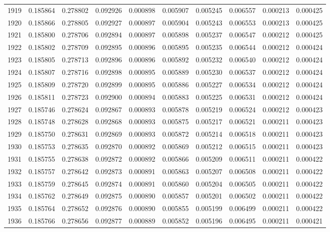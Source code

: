 \begin{tabular}{lrrrrrrrrr}
1919 & 0.185864 & 0.278802 & 0.092926 & 0.000898 & 0.005907 & 0.005245 & 0.006557 & 0.000213 & 0.000425 \\
1920 & 0.185866 & 0.278805 & 0.092927 & 0.000897 & 0.005904 & 0.005243 & 0.006553 & 0.000213 & 0.000425 \\
1921 & 0.185800 & 0.278706 & 0.092894 & 0.000897 & 0.005898 & 0.005237 & 0.006547 & 0.000212 & 0.000425 \\
1922 & 0.185802 & 0.278709 & 0.092895 & 0.000896 & 0.005895 & 0.005235 & 0.006544 & 0.000212 & 0.000424 \\
1923 & 0.185805 & 0.278713 & 0.092896 & 0.000896 & 0.005892 & 0.005232 & 0.006540 & 0.000212 & 0.000424 \\
1924 & 0.185807 & 0.278716 & 0.092898 & 0.000895 & 0.005889 & 0.005230 & 0.006537 & 0.000212 & 0.000424 \\
1925 & 0.185809 & 0.278720 & 0.092899 & 0.000895 & 0.005886 & 0.005227 & 0.006534 & 0.000212 & 0.000424 \\
1926 & 0.185811 & 0.278723 & 0.092900 & 0.000894 & 0.005883 & 0.005225 & 0.006531 & 0.000212 & 0.000424 \\
1927 & 0.185746 & 0.278624 & 0.092867 & 0.000893 & 0.005878 & 0.005219 & 0.006524 & 0.000212 & 0.000423 \\
1928 & 0.185748 & 0.278628 & 0.092868 & 0.000893 & 0.005875 & 0.005217 & 0.006521 & 0.000211 & 0.000423 \\
1929 & 0.185750 & 0.278631 & 0.092869 & 0.000893 & 0.005872 & 0.005214 & 0.006518 & 0.000211 & 0.000423 \\
1930 & 0.185753 & 0.278635 & 0.092870 & 0.000892 & 0.005869 & 0.005212 & 0.006515 & 0.000211 & 0.000423 \\
1931 & 0.185755 & 0.278638 & 0.092872 & 0.000892 & 0.005866 & 0.005209 & 0.006511 & 0.000211 & 0.000422 \\
1932 & 0.185757 & 0.278642 & 0.092873 & 0.000891 & 0.005863 & 0.005207 & 0.006508 & 0.000211 & 0.000422 \\
1933 & 0.185759 & 0.278645 & 0.092874 & 0.000891 & 0.005860 & 0.005204 & 0.006505 & 0.000211 & 0.000422 \\
1934 & 0.185762 & 0.278649 & 0.092875 & 0.000890 & 0.005857 & 0.005201 & 0.006502 & 0.000211 & 0.000422 \\
1935 & 0.185764 & 0.278652 & 0.092876 & 0.000890 & 0.005855 & 0.005199 & 0.006499 & 0.000211 & 0.000422 \\
1936 & 0.185766 & 0.278656 & 0.092877 & 0.000889 & 0.005852 & 0.005196 & 0.006495 & 0.000211 & 0.000421 \\

\end{tabular}
